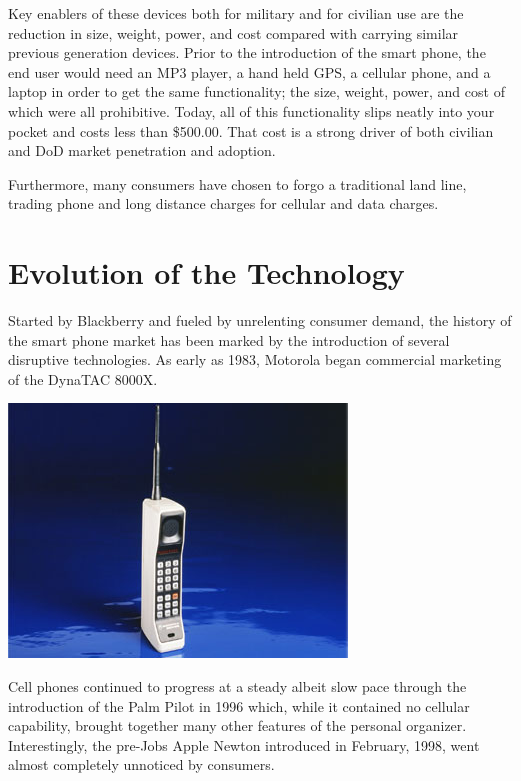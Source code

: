 \documentclass[letterpaper,12pt]{article}
\begin{document}
Key enablers of these devices both for military and for civilian use are the reduction in size, weight, power, and cost compared with carrying similar previous generation devices.  Prior to the introduction of the smart phone, the end user would need an MP3 player, a hand held GPS, a cellular phone, and a laptop in order to get the same functionality; the size, weight, power, and cost of which were all prohibitive.  Today, all of this functionality slips neatly into your pocket and costs less than \$500.00.  That cost is a strong driver of both civilian and DoD market penetration and adoption.

Furthermore, many consumers have chosen to forgo a traditional land line, trading phone and long distance charges for cellular and data charges.

\section*{Evolution of the Technology}
Started by Blackberry and fueled by unrelenting consumer demand, the history of the smart phone market has been marked by the introduction of several disruptive technologies.  As early as 1983, Motorola began commercial marketing of the DynaTAC 8000X.  

\begin{center}
\includegraphics[scale=0.7]{images/dynaTac8000}
\end{center}

Cell phones continued to progress at a steady albeit slow pace through the introduction of the Palm Pilot in 1996 which, while it contained no cellular capability, brought together many other features of the personal organizer.  Interestingly, the pre-Jobs Apple Newton introduced in February, 1998, went almost completely unnoticed by consumers.  
\end{document}
